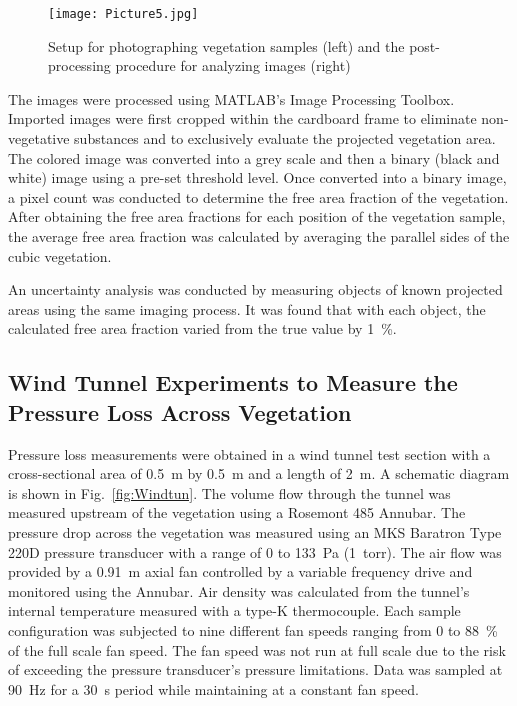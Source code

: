 \documentclass[12pt]{article}
\begin{document}
\begin{figure} [h]
	\centering 	\texttt{[image: Picture5.jpg]}
	\caption{Setup for photographing vegetation samples (left) and the post-processing procedure for analyzing images (right)}
	\label{fig:ImgAnaly}
\end{figure}

The images were processed using MATLAB's Image Processing Toolbox. Imported images were first cropped within the cardboard frame to eliminate non-vegetative substances and to exclusively evaluate the projected vegetation area. The colored image was converted into a grey scale and then a binary (black and white) image using a pre-set threshold level. Once converted into a binary image, a pixel count was conducted to determine the free area fraction of the vegetation. After obtaining the free area fractions for each position of the vegetation sample, the average free area fraction was calculated by averaging the parallel sides of the cubic vegetation.

An uncertainty analysis was conducted by measuring objects of known projected areas using the same imaging process. It was found that with each object, the calculated free area fraction varied from the true value by 1~\%.

\subsection{Wind Tunnel Experiments to Measure the Pressure Loss Across Vegetation}
\label{ssec:headingscap}

Pressure loss measurements were obtained in a wind tunnel test section with a cross-sectional area of 0.5~m by 0.5~m and a length of 2~m. A schematic diagram is shown in Fig.~\ref{fig:Windtun}. The volume flow through the tunnel was measured upstream of the vegetation using a Rosemont 485 Annubar. The pressure drop across the vegetation was measured using an MKS Baratron Type 220D pressure transducer with a range of 0 to 133~Pa (1~torr). The air flow was provided by a 0.91~m axial fan controlled by a variable frequency drive and monitored using the Annubar. Air density was calculated from the tunnel's internal temperature measured with a type-K thermocouple. Each sample configuration was subjected to nine different fan speeds ranging from 0 to 88~\% of the full scale fan speed. The fan speed was not run at full scale due to the risk of exceeding the pressure transducer's pressure limitations. Data was sampled at 90~Hz for a 30~s period while maintaining at a constant fan speed.
\end{document}
